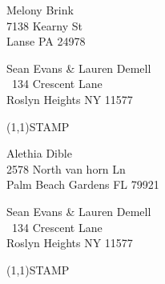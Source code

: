 \documentclass[12pt]{article}
\begin{document}
\begin{center} \begin{Huge} \vspace*{\fill}
Melony Brink\\
7138 Kearny St\\
Lanse PA 24978\\
\vspace{\fill} \end{Huge} \end{center}

\clearpage

\begin{minipage}{.5\linewidth} \noindent
Sean Evans \& Lauren Demell\\\ 
134 Crescent Lane\\ 
Roslyn Heights NY 11577
\end{minipage}
\begin{minipage}{.5\linewidth \hspace{-.2in} \vspace{-.3in}}
\begin{flushright}
\framebox(1,1){STAMP}
\end{flushright}
\end{minipage}

\begin{center} \begin{Huge} \vspace*{\fill}
Alethia Dible\\
2578 North van horn Ln\\
Palm Beach Gardens FL 79921\\
\vspace{\fill} \end{Huge} \end{center}

\clearpage

\begin{minipage}{.5\linewidth} \noindent
Sean Evans \& Lauren Demell\\\ 
134 Crescent Lane\\ 
Roslyn Heights NY 11577
\end{minipage}
\begin{minipage}{.5\linewidth \hspace{-.2in} \vspace{-.3in}}
\begin{flushright}
\framebox(1,1){STAMP}
\end{flushright}
\end{minipage}
\end{document}
